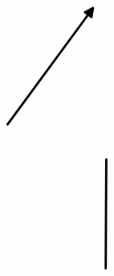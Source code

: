 \documentclass[10pt]{article}
\theoremstyle{plain}
\theoremstyle{remark}
\begin{document}
\[\begin{pgfpicture}
\begin{pgfscope}
\pgfpathlineto{\pgfqpoint{2.817050in}{3.599246in}}%
\pgfpathlineto{\pgfqpoint{2.736904in}{3.659051in}}%
\pgfpathclose%
\pgfusepath{stroke,fill}%
\end{pgfscope}%
\begin{pgfscope}%
\pgfpathrectangle{\pgfqpoint{0.242589in}{0.187957in}}{\pgfqpoint{2.799137in}{5.640000in}} %
\pgfusepath{clip}%
\pgfsetroundcap%
\pgfsetroundjoin%
\pgfsetlinewidth{2.007500pt}%
\definecolor{currentstroke}{rgb}{0.000000,0.000000,0.000000}%
\pgfsetstrokecolor{currentstroke}%
\pgfsetdash{}{0pt}%
\pgfpathmoveto{\pgfqpoint{0.428207in}{4.089963in}}%
\pgfpathquadraticcurveto{\pgfqpoint{0.964994in}{4.815627in}}{\pgfqpoint{1.483312in}{5.516322in}}%
\pgfusepath{stroke}%
\end{pgfscope}%
\begin{pgfscope}%
\pgfpathrectangle{\pgfqpoint{0.242589in}{0.187957in}}{\pgfqpoint{2.799137in}{5.640000in}} %
\pgfusepath{clip}%
\pgfsetroundcap%
\pgfsetroundjoin%
\definecolor{currentfill}{rgb}{0.000000,0.000000,0.000000}%
\pgfsetfillcolor{currentfill}%
\pgfsetlinewidth{2.007500pt}%
\definecolor{currentstroke}{rgb}{0.000000,0.000000,0.000000}%
\pgfsetstrokecolor{currentstroke}%
\pgfsetdash{}{0pt}%
\pgfpathmoveto{\pgfqpoint{1.383645in}{5.465662in}}%
\pgfpathlineto{\pgfqpoint{1.483312in}{5.516322in}}%
\pgfpathlineto{\pgfqpoint{1.464040in}{5.406193in}}%
\pgfpathlineto{\pgfqpoint{1.383645in}{5.465662in}}%
\pgfpathclose%
\pgfusepath{stroke,fill}%
\end{pgfscope}%
\begin{pgfscope}%
\pgfpathrectangle{\pgfqpoint{0.242589in}{0.187957in}}{\pgfqpoint{2.799137in}{5.640000in}} %
\pgfusepath{clip}%
\pgfsetroundcap%
\pgfsetroundjoin%
\pgfsetlinewidth{2.007500pt}%
\definecolor{currentstroke}{rgb}{0.000000,0.000000,0.000000}%
\pgfsetstrokecolor{currentstroke}%
\pgfsetdash{}{0pt}%
\pgfpathmoveto{\pgfqpoint{1.640223in}{2.325742in}}%
\pgfpathquadraticcurveto{\pgfqpoint{1.644048in}{3.007954in}}{\pgfqpoint{1.647699in}{3.659111in}}%
\pgfusepath{stroke}%
\end{pgfscope}%
\begin{pgfscope}%
\pgfpathrectangle{\pgfqpoint{0.242589in}{0.187957in}}{\pgfqpoint{2.799137in}{5.640000in}} %
\pgfusepath{clip}%
\pgfsetroundcap%
\pgfsetroundjoin%
\definecolor{currentfill}{rgb}{0.000000,0.000000,0.000000}%
\pgfsetfillcolor{currentfill}%
\pgfsetlinewidth{2.007500pt}%
\definecolor{currentstroke}{rgb}{0.000000,0.000000,0.000000}%
\pgfsetstrokecolor{currentstroke}%
\pgfsetdash{}{0pt}%
\pgfpathmoveto{\pgfqpoint{1.597139in}{3.559393in}}%
\pgfpathlineto{\pgfqpoint{1.647699in}{3.659111in}}%

\end{pgfscope}
\end{pgfpicture}\]
\end{document}
